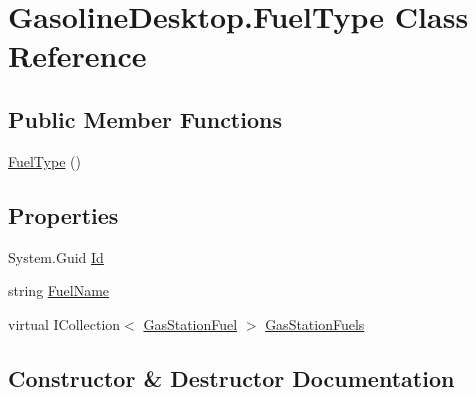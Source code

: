 \hypertarget{class_gasoline_desktop_1_1_fuel_type}{}\section{Gasoline\+Desktop.\+Fuel\+Type Class Reference}
\label{class_gasoline_desktop_1_1_fuel_type}
\subsection*{Public Member Functions}
\begin{DoxyCompactItemize}
\item 
\mbox{\hyperlink{class_gasoline_desktop_1_1_fuel_type_aa387f46897546dbe3da11d0e9f24e9eb}{Fuel\+Type}} ()
\end{DoxyCompactItemize}
\subsection*{Properties}
\begin{DoxyCompactItemize}
\item 
System.\+Guid \mbox{\hyperlink{class_gasoline_desktop_1_1_fuel_type_a4a8a632c5e2a4dea117a0b72ecaa9626}{Id}}
\item 
string \mbox{\hyperlink{class_gasoline_desktop_1_1_fuel_type_ad13440b0880b9afdc0a26ae92d1c221a}{Fuel\+Name}}
\item 
virtual I\+Collection$<$ \mbox{\hyperlink{class_gasoline_desktop_1_1_gas_station_fuel}{Gas\+Station\+Fuel}} $>$ \mbox{\hyperlink{class_gasoline_desktop_1_1_fuel_type_a208607681ba906422bf22dd278caebd8}{Gas\+Station\+Fuels}}
\end{DoxyCompactItemize}


\subsection{Constructor \& Destructor Documentation}
\mbox{\label{class_gasoline_desktop_1_1_fuel_type_aa387f46897546dbe3da11d0e9f24e9eb}} 
